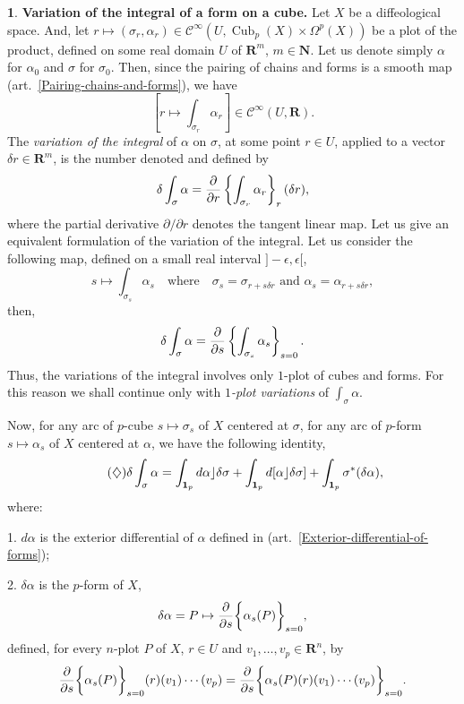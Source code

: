 \documentclass[11pt,reqno]{amsart}
\theoremstyle{definition}
\newtheorem{article}{}
\newcommand{\artlabel}[1]{{\bf #1.}}
\renewcommand{\over}{\above .2pt}
\newcommand{\qmbox}[1]{\quad \mbox{#1}\quad}
\newcommand{\NN}{{\mathbf N}}
\newcommand{\RR}{{\mathbf R}}
\def \P{{P}}
\def \U{{U}}
\def \X{{X}}
\newcommand{\cC}{{\mathcal C}}
\newcommand{\art}[1]{{(art.~\ref{#1})}}
\newcommand{\DCubes}[1]{\operatorname{Cub}_{#1}}
\newcommand{\Cinf}{{\cC}^\infty}
\newcommand{\Der}{\partial}
\newcommand{\id}{{\bf 1}}
\begin{document}
  \begin{article}\artlabel{Variation of the integral of a form on a cube}
    \label{Variation-of-the-integral-of-a-form-on-a-cube}
    Let $\X$ be a diffeological space. And, let $r \mapsto 
      (\sigma_r,\alpha_r) \in \Cinf(\U,\DCubes{p}(\X) \times
      \Omega^p(\X))$ be a plot of the product, defined on some
    real domain $\U$ of $\RR^m$, $m \in \NN$. Let us
    denote simply $\alpha$ for $\alpha_0$ and $\sigma$ for
    $\sigma_0$. Then,  since the pairing of chains
    and forms is a smooth map
    \art{Pairing-chains-and-forms}, we have
    $$
      \left[ r \mapsto
      \int_{\sigma_r}\alpha_r\right] \in \Cinf(\U,\RR).
      $$ 
    The {\em variation of the
    integral} of $\alpha$ on $\sigma$, at some point $r
      \in \U$, applied to a vector $\delta r \in \RR^m$, is the
    number denoted and defined by
    $$
      \delta \int_\sigma \alpha = {\partial \over \partial r}
      \left\{ \int_{\sigma_r}\alpha_r\right\}_{r} (\delta r),
      $$
    where the partial derivative $\Der /\Der r$ denotes the
    tangent linear map. Let us give an
    equivalent formulation of the variation of the integral.
    Let us consider the following map, defined on a small
    real interval $]-\epsilon,\epsilon[$,
    $$
      s \mapsto \int_{\sigma_s} \alpha_s \qmbox{where} \sigma_s
      =  \sigma_{r+s\delta r} \mbox{ and } \alpha_s =
      \alpha_{r+s\delta r},
      $$
    then, 
    $$
      \delta \int_\sigma \alpha = {\partial \over \partial s}
      \left\{ \int_{\sigma_s}\alpha_s\right\}_{s = 0}.
    $$
    Thus, the variations of the integral  involves only
    $1$-plot of cubes and forms. For this reason we shall
    continue only with {\em $1$-plot variations} of
    $\int_\sigma \alpha$.
    
    Now, for any arc of $p$-cube
    $s \mapsto \sigma_s$ of $\X$ centered at $\sigma$, for any
    arc of $p$-form $s \mapsto \alpha_s$ of $\X$ centered at
    $\alpha$, we have the following identity,
    \begin{equation} \tag{$\diamondsuit$}
      \delta \int_\sigma \alpha
      = \int_{\id_p} d\alpha \rfloor \delta\sigma +
      \int_{\id_p} d[\alpha \rfloor \delta\sigma] + \int_{\id_p}
      \sigma^*(\delta \alpha),
    \end{equation}
    where: 
     
      1. $d\alpha$ is the exterior differential of
      $\alpha$ defined in
      \art{Exterior-differential-of-forms};
      
      2. $\delta \alpha$ is the $p$-form of
      $\X$, 
      $$
        \delta \alpha = \P \mapsto {\partial \over \partial s}
        \bigg\{\alpha_s(\P)\bigg\}_{s = 0},
        $$
      defined, for every $n$-plot $\P$ of $\X$, $r \in \U$ and $v_1,\ldots, v_p \in
        \RR^n$, by
      $$
        {\partial \over \partial s}
        \bigg\{\alpha_s(\P)\bigg\}_{s
        = 0}(r)(v_1) \cdots (v_p) = {\partial \over \partial s}
        \bigg\{\alpha_s(\P)(r)(v_1) \cdots (v_p)\bigg\}_{s = 0}.
        $$ 
                

\end{article}
\end{document}

